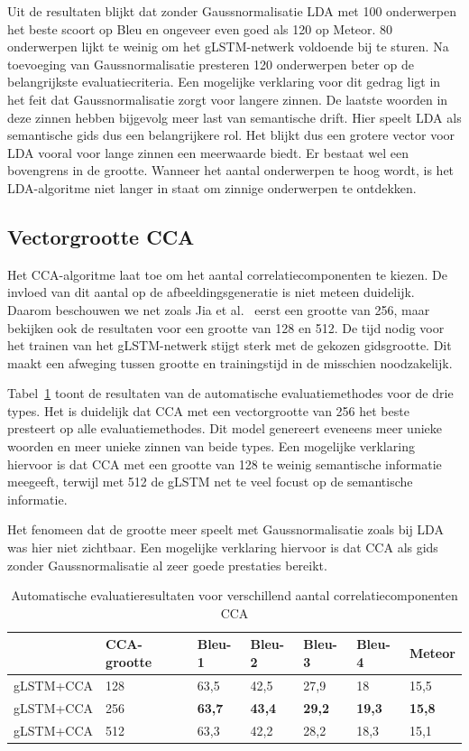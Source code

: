 Uit de resultaten blijkt dat zonder Gaussnormalisatie LDA met 100 onderwerpen het beste scoort op Bleu en ongeveer even goed als 120 op Meteor. 80 onderwerpen lijkt te weinig om het gLSTM-netwerk voldoende bij te sturen. Na toevoeging van Gaussnormalisatie presteren 120 onderwerpen beter op de belangrijkste evaluatiecriteria. Een mogelijke verklaring voor dit gedrag ligt in het feit dat Gaussnormalisatie zorgt voor langere zinnen. De laatste woorden in deze zinnen hebben bijgevolg meer last van semantische drift. Hier speelt LDA als semantische gids dus een belangrijkere rol. Het blijkt dus een grotere vector voor LDA vooral voor lange zinnen een meerwaarde biedt. Er bestaat wel een bovengrens in de grootte. Wanneer het aantal onderwerpen te hoog wordt, is het LDA-algoritme niet langer in staat om zinnige onderwerpen te ontdekken.

\subsection{Vectorgrootte CCA} 
Het CCA-algoritme laat toe om het aantal correlatiecomponenten te kiezen. De invloed van dit aantal op de afbeeldingsgeneratie is niet meteen duidelijk. Daarom beschouwen we net zoals Jia et al.~\cite{Fernando2015} eerst een grootte van 256, maar bekijken ook de resultaten voor een grootte van 128 en 512. De tijd nodig voor het trainen van het gLSTM-netwerk stijgt sterk met de gekozen gidsgrootte. Dit maakt een afweging tussen grootte en trainingstijd in de misschien noodzakelijk.

Tabel~\ref{table:results_cca} toont de resultaten van de automatische evaluatiemethodes voor de drie types. Het is duidelijk dat CCA met een vectorgrootte van 256 het beste presteert op alle evaluatiemethodes. Dit model genereert eveneens meer unieke woorden en meer unieke zinnen van beide types. Een mogelijke verklaring hiervoor is dat CCA met een grootte van 128 te weinig semantische informatie meegeeft, terwijl met 512 de gLSTM net te veel focust op de semantische informatie.

Het fenomeen dat de grootte meer speelt met Gaussnormalisatie zoals bij LDA was hier niet zichtbaar. Een mogelijke verklaring hiervoor is dat CCA als gids zonder Gaussnormalisatie al zeer goede prestaties bereikt.
\begin{table}
	\centering
	\begin{tabular}{lllllll}
		~              & CCA-grootte     & Bleu-1 & Bleu-2 & Bleu-3 & Bleu-4 & Meteor \\ \hline
		gLSTM+CCA & 128        & 63,5   & 42,5 			& 27,9   & 18   & 15,5  \\
		gLSTM+CCA & 256        & \textbf{63,7}   & \textbf{43,4}   & \textbf{29,2}   & \textbf{19,3}   & \textbf{15,8}  \\
		gLSTM+CCA & 512        & 63,3   & 42,2   & 28,2   & 18,3 & 15,1  \\ \hline
	
	\end{tabular}

	\caption{Automatische evaluatieresultaten voor verschillend aantal correlatiecomponenten CCA}
		\label{table:results_cca}
\end{table}



